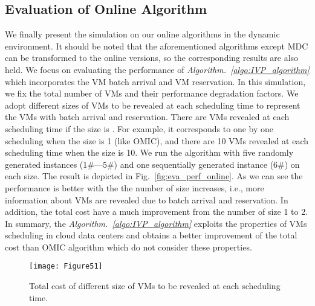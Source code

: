 \documentclass[10pt,journal]{IEEEtran}
\begin{document}
\subsection{Evaluation of Online Algorithm}
We finally present the simulation on our online algorithms in the dynamic environment. It should be noted that the aforementioned algorithms except MDC can be transformed to the online versions, so the corresponding results are also held. We focus on evaluating the performance of \textit{Algorithm.~\ref{algo:IVP_algorithm}} which incorporates the VM batch arrival and VM reservation. In this simulation, we fix the total number of VMs and their performance degradation factors. We adopt different sizes of VMs to be revealed at each scheduling time to represent the VMs with batch arrival and reservation. There are  VMs revealed at each scheduling time if the size is . For example, it corresponds to one by one scheduling when the size is 1 (like OMIC), and there are 10 VMs revealed at each scheduling time when the size is 10. We run the algorithm with five randomly generated instances (1\#---5\#) and one sequentially generated instance (6\#) on each size. The result is depicted in Fig.~\ref{fig:eva_perf_online}. As we can see the performance is better with the the number of size increases, i.e., more information about VMs are revealed due to batch arrival and reservation. In addition, the total cost have a much improvement from the number of size 1 to 2. In summary, the \textit{Algorithm.~\ref{algo:IVP_algorithm}} exploits the properties of VMs scheduling in cloud data centers and obtains a better improvement of the total cost than OMIC algorithm which do not consider these properties.
\begin{figure}[htbp]
\centering
\texttt{[image: Figure51]}
\centering
\caption{\label{fig:eva_perf_online}Total cost of different size  of VMs to be revealed at each scheduling time.}\label{fig:graph}
\end{figure}
\end{document}
